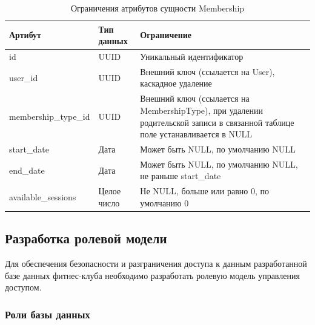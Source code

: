 \begin{table}[H]
	\centering
	\begin{tabular}{|p{4.5cm}|p{3.5cm}|p{7.5cm}|}
		\hline
		\textbf{Артибут}             & \textbf{Тип данных}   & \textbf{Ограничение}             \\ \hline
		id                            & UUID                  & Уникальный идентификатор         \\ \hline
		user\_id                      & UUID                  & Внешний ключ (ссылается на User), каскадное удаление \\ \hline
		membership\_type\_id          & UUID                  & Внешний ключ (ссылается на MembershipType),  при удалении родительской записи в связанной таблице поле устанавливается в NULL \\ \hline
		start\_date                   & Дата                  & Может быть NULL, по умолчанию NULL \\ \hline
		end\_date                     & Дата                  & Может быть NULL, по умолчанию NULL, не раньше start\_date \\ \hline
		available\_sessions           & Целое число               & Не NULL, больше или равно 0, по умолчанию 0 \\ \hline
	\end{tabular}
	\caption{Ограничения атрибутов сущности Membership}
	\label{t:at}
\end{table}

\subsection{Разработка ролевой модели}

Для обеспечения безопасности и разграничения доступа к данным разработанной базе данных фитнес-клуба необходимо разработать ролевую модель управления доступом.

\subsubsection*{Роли базы данных}

